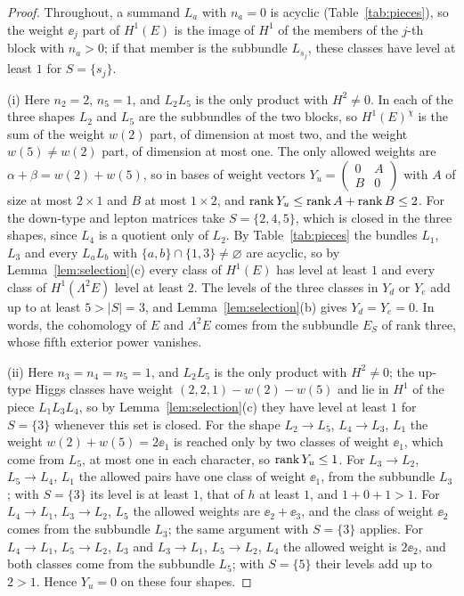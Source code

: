 \begin{proof}
Throughout, a summand $L_a$ with $n_a=0$ is acyclic (Table~\ref{tab:pieces}),
so the weight $\ee_j$ part of $H^1(E)$ is the image of $H^1$ of the members
of the $j$-th block with $n_a>0$; if that member is the subbundle
$L_{s_j}$, these classes have level at least $1$ for $S=\{s_j\}$.

(i) Here $n_2=2$, $n_5=1$, and $L_2L_5$ is the only product with $H^2\ne0$.
In each of the three shapes $L_2$ and $L_5$ are the subbundles of the two
blocks, so $H^1(E)^\chi$ is the sum of the weight $w(2)$ part, of dimension
at most two, and the weight $w(5)\ne w(2)$ part, of dimension at most one.
The only allowed weights are $\alpha+\beta=w(2)+w(5)$, so in bases of weight
vectors $Y_u=\left(\begin{smallmatrix}0&A\\B&0\end{smallmatrix}\right)$ with
$A$ of size at most $2\times1$ and $B$ at most $1\times2$, and
$\operatorname{rank} Y_u\le\operatorname{rank} A+\operatorname{rank} B\le2$. For the down-type and lepton matrices take
$S=\{2,4,5\}$, which is closed in the three shapes, since $L_4$ is a
quotient only of $L_2$. By Table~\ref{tab:pieces} the bundles $L_1$, $L_3$
and every $L_aL_b$ with $\{a,b\}\cap\{1,3\}\ne\varnothing$ are acyclic, so by
Lemma~\ref{lem:selection}(c) every class of $H^1(E)$ has level at least $1$
and every class of $H^1(\Lambda^2E)$ level at least $2$. The levels of the
three classes in $Y_d$ or $Y_e$ add up to at least $5>|S|=3$, and
Lemma~\ref{lem:selection}(b) gives $Y_d=Y_e=0$. In words, the cohomology of
$E$ and $\Lambda^2E$ comes from the subbundle $E_S$ of rank three, whose
fifth exterior power vanishes.

(ii) Here $n_3=n_4=n_5=1$, and $L_2L_5$ is the only product with $H^2\ne0$;
the up-type Higgs classes have weight $(2,2,1)-w(2)-w(5)$ and lie in
$H^1$ of the piece $L_1L_3L_4$, so by Lemma~\ref{lem:selection}(c) they have
level at least $1$ for $S=\{3\}$ whenever this set is closed.
For the shape $L_2\to L_5$, $L_4\to L_3$, $L_1$ the weight $w(2)+w(5)=2\ee_1$
is reached only by two classes of weight $\ee_1$, which come from $L_5$, at
most one in each character, so $\operatorname{rank} Y_u\le1$. For
$L_3\to L_2$, $L_5\to L_4$, $L_1$ the allowed pairs have one class of
weight $\ee_1$, from the subbundle $L_3$; with $S=\{3\}$ its level is at
least $1$, that of $h$ at least $1$, and $1+0+1>1$. For
$L_4\to L_1$, $L_3\to L_2$, $L_5$ the allowed weights are $\ee_2+\ee_3$, and
the class of weight $\ee_2$ comes from the subbundle $L_3$; the same
argument with $S=\{3\}$ applies. For $L_4\to L_1$, $L_5\to L_2$, $L_3$ and
$L_3\to L_1$, $L_5\to L_2$, $L_4$ the allowed weight is $2\ee_2$, and both
classes come from the subbundle $L_5$; with $S=\{5\}$ their levels add up to
$2>1$. Hence $Y_u=0$ on these four shapes.


\end{proof}
